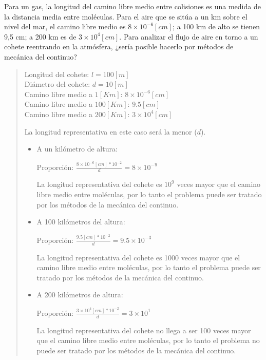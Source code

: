 \documentclass[a4paper,12pt,twoside,final,spanish]{article}
\begin{document}
Para un gas, la longitud del camino libre medio entre colisiones es una medida de la distancia media entre moléculas. Para el aire que se sitúa a un km sobre el nivel del mar, el camino libre medio es $8\times10^{-6}[cm]$; a 100 km de alto se tienen 9,5 cm; a 200 km es de $3\times10^{4}[cm]$. Para analizar el flujo de aire en torno a un cohete reentrando en la atmósfera, ¿sería posible hacerlo por métodos de mecánica del continuo? 

\dotfill

\begin{quote}
Longitud del cohete: $l=100[m]$\\
Diámetro del cohete: $d=10[m]$\\
Camino libre medio a $1[Km]$: $8\times10^{-6}[cm]$\\
Camino libre medio a $100[Km]$: $9.5[cm]$\\
Camino libre medio a $200[Km]$: $3\times10^{4}[cm]$

La longitud representativa en este caso será la menor ($d$).

\begin{itemize}
\item A un kilómetro de altura:

Proporción: $\frac{8\times10^{-6}[cm]*10^{-2}}{d}=8\times10^{-9}$

La longitud representativa del cohete es $10^{9}$ veces mayor que el camino libre medio entre moléculas, por lo tanto el problema puede ser tratado por los métodos de la mecánica del continuo.

\item A 100 kilómetros del altura:

Proporción: $\frac{9.5[cm]*10^{-2}}{d}=9.5\times10^{-3}$

La longitud representativa del cohete es 1000 veces mayor que el camino libre medio entre moléculas, por lo tanto el problema puede ser tratado por los métodos de la mecánica del continuo.

\item A 200 kilómetros de altura:

Proporción: $\frac{3\times10^{4}[cm]*10^{-2}}{d}=3\times10^{1}$

La longitud representativa del cohete no llega a ser 100 veces mayor que el camino libre medio entre moléculas, por lo tanto el problema no puede ser tratado por los métodos de la mecánica del continuo.
\end{itemize}
\end{quote}
\end{document}
